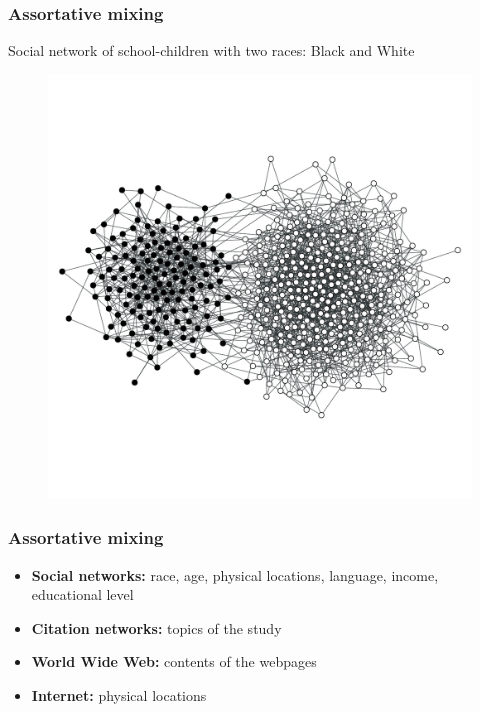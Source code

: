 \documentclass{beamer}
\begin{document}
\begin{frame}
    \frametitle{Assortative mixing}
    \vspace{2em}
    \centering
    {\small Social network of school-children with two races: Black and White}
    \begin{figure}
        \begin{center}
        \includegraphics[width=0.8\columnwidth,trim=0 0 0 50,clip=true]{assort_network.pdf}
        \end{center}
    \end{figure}
\end{frame}
\begin{frame}
    \frametitle{Assortative mixing}
        \begin{itemize}
        \setlength\itemsep{1em}
            \item{{\bf Social networks:} race, age, physical locations, language, income, educational level}
            \item{{\bf Citation networks:} topics of the study}
            \item{{\bf World Wide Web:} contents of the webpages}
            \item{{\bf Internet:} physical locations}
        \end{itemize}
\end{frame}
\end{document}
